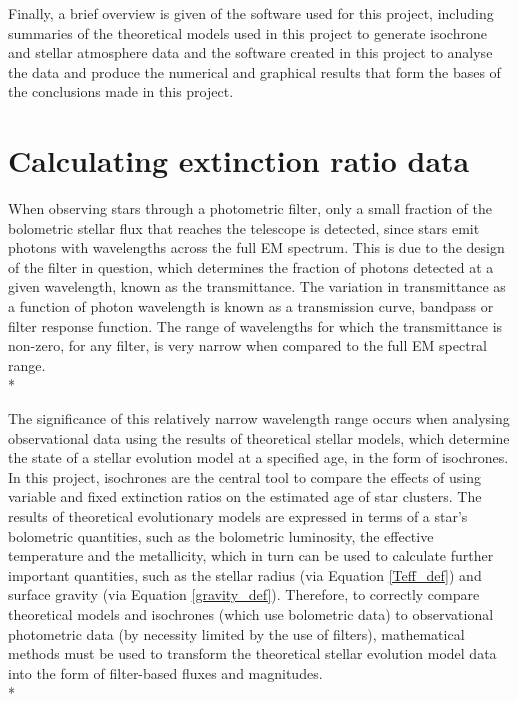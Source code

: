 \documentclass[12pt, a4paper]{report}
\begin{document}
Finally, a brief overview is given of the software used for this project, including summaries of the theoretical models used in this project to generate isochrone and stellar atmosphere data and the software created in this project to analyse the data and produce the numerical and graphical results that form the bases of the conclusions made in this project.

\section{Calculating extinction ratio data} \label{ext_ratio_data}

When observing stars through a photometric filter, only a small fraction of the bolometric stellar flux that reaches the telescope is detected, since stars emit photons with wavelengths across the full EM spectrum. This is due to the design of the filter in question, which determines the fraction of photons detected at a given wavelength, known as the transmittance. The variation in transmittance as a function of photon wavelength is known as a transmission curve, bandpass or filter response function. The range of wavelengths for which the transmittance is non-zero, for any filter, is very narrow when compared to the full EM spectral range.\\* 

The significance of this relatively narrow wavelength range occurs when analysing observational data using the results of theoretical stellar models, which determine the state of a stellar evolution model at a specified age, in the form of isochrones. In this project, isochrones are the central tool to compare the effects of using variable and fixed extinction ratios on the estimated age of star clusters. The results of theoretical evolutionary models are expressed in terms of a star's bolometric quantities, such as the bolometric luminosity, the effective temperature and the metallicity, which in turn can be used to calculate further important quantities, such as the stellar radius (via Equation \ref{Teff_def}) and surface gravity (via Equation \ref{gravity_def}). Therefore, to correctly compare theoretical models and isochrones (which use bolometric data) to observational photometric data (by necessity limited by the use of filters), mathematical methods must be used to transform the theoretical stellar evolution model data into the form of filter-based fluxes and magnitudes.\\*
\end{document}
